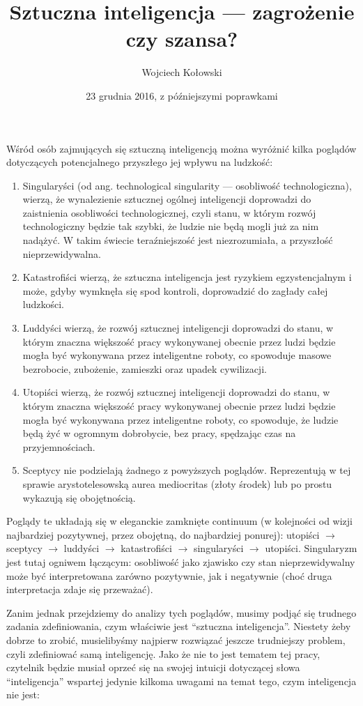 \documentclass[10pt,a4paper]{article}
\title{Sztuczna inteligencja — zagrożenie czy szansa?}
\author{Wojciech Kołowski}
\date{23 grudnia 2016, z późniejszymi poprawkami}
\begin{document}
	\maketitle
	
	\par Wśród osób zajmujących się sztuczną inteligencją można wyróżnić kilka poglądów dotyczących potencjalnego przyszłego jej wpływu na ludzkość:
	\begin{enumerate}
		\item Singularyści (od ang. technological singularity — osobliwość technologiczna), wierzą, że wynalezienie sztucznej ogólnej inteligencji doprowadzi do zaistnienia osobliwości technologicznej, czyli stanu, w którym rozwój technologiczny będzie tak szybki, że ludzie nie będą mogli już za nim nadążyć. W takim świecie teraźniejszość jest niezrozumiała, a przyszłość nieprzewidywalna.
		\item Katastrofiści wierzą, że sztuczna inteligencja jest ryzykiem egzystencjalnym i może, gdyby wymknęła się spod kontroli, doprowadzić do zagłady całej ludzkości.
		\item Luddyści wierzą, że rozwój sztucznej inteligencji doprowadzi do stanu, w którym znaczna większość pracy wykonywanej obecnie przez ludzi będzie mogła być wykonywana przez inteligentne roboty, co spowoduje masowe bezrobocie, zubożenie, zamieszki oraz upadek cywilizacji.
		\item Utopiści wierzą, że rozwój sztucznej inteligencji doprowadzi do stanu, w którym znaczna większość pracy wykonywanej obecnie przez ludzi będzie mogła być wykonywana przez inteligentne roboty, co spowoduje, że ludzie będą żyć w ogromnym dobrobycie, bez pracy, spędzając czas na przyjemnościach.
		\item Sceptycy nie podzielają żadnego z powyższych poglądów. Reprezentują w tej sprawie arystotelesowską aurea mediocritas (złoty środek) lub po prostu wykazują się obojętnością.
	\end{enumerate}
	\par Poglądy te układają się w eleganckie zamknięte continuum (w kolejności od wizji najbardziej pozytywnej, przez obojętną, do najbardziej ponurej): utopiści $\to$ sceptycy $\to$ luddyści $\to$ katastrofiści $\to$ singularyści $\to$ utopiści. Singularyzm jest tutaj ogniwem łączącym: osobliwość jako zjawisko czy stan nieprzewidywalny może być interpretowana zarówno pozytywnie, jak i negatywnie (choć druga interpretacja zdaje się przeważać).
	\par Zanim jednak przejdziemy do analizy tych poglądów, musimy podjąć się trudnego zadania zdefiniowania, czym właściwie jest ``sztuczna inteligencja''. Niestety żeby dobrze to zrobić, musielibyśmy najpierw rozwiązać jeszcze trudniejszy problem, czyli zdefiniować samą inteligencję. Jako że nie to jest tematem tej pracy, czytelnik będzie musiał oprzeć się na swojej intuicji dotyczącej słowa ``inteligencja'' wspartej jedynie kilkoma uwagami na temat tego, czym inteligencja nie jest:
\end{document}
